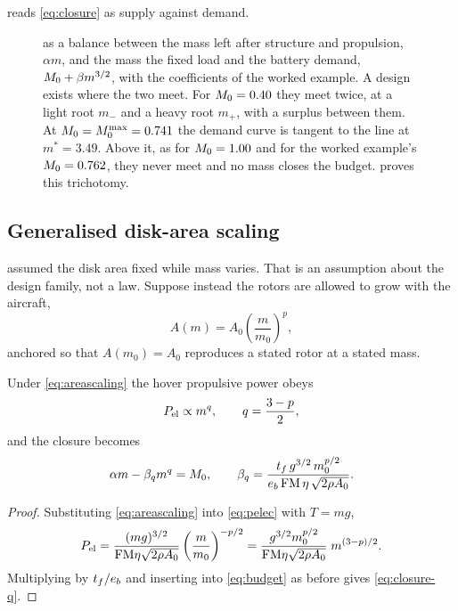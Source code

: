  reads \cref{eq:closure} as supply against demand.

\begin{figure}[tbp]
\centering

\caption{ as a balance between the mass left after structure
and propulsion, $\alpha m$, and the mass the fixed load and the battery demand,
$M_0 + \beta m^{3/2}$, with the coefficients of the worked example. A
design exists where the two meet. For $M_0 = 0.40$ they meet twice, at a
light root $m_-$ and a heavy root $m_+$, with a surplus between them. At
$M_0 = M_0^{\max} = 0.741$ the demand curve is tangent to the line at
$m^* = 3.49$. Above it, as for $M_0 = 1.00$ and for the worked example's
$M_0 = 0.762$, they never meet and no mass closes the budget.
 proves this trichotomy.}
\label{fig:closuregraph}
\end{figure}

\subsection{Generalised disk-area scaling}

 assumed the disk area fixed while mass varies. That is an
assumption about the design family, not a law. Suppose instead the rotors are
allowed to grow with the aircraft,
\begin{equation}
  A(m) = A_0 \left(\frac{m}{m_0}\right)^{p} ,
  \label{eq:areascaling}
\end{equation}
anchored so that $A(m_0) = A_0$ reproduces a stated rotor at a stated mass.

\begin{proposition}
\label{prop:plaw}
Under \cref{eq:areascaling} the hover propulsive power obeys
\begin{equation}
  P_{\mathrm{el}} \propto m^{q}, \qquad q = \frac{3-p}{2} ,
  \label{eq:qexp}
\end{equation}
and the closure becomes
\begin{equation}
  \alpha m - \beta_q m^{q} = M_0,
  \qquad
  \beta_q = \frac{t_f\,g^{3/2}\,m_0^{p/2}}
                 {e_b\,\mathrm{FM}\,\eta\,\sqrt{2\rho A_0}} .
  \label{eq:closure-q}
\end{equation}
\end{proposition}

\begin{proof}
Substituting \cref{eq:areascaling} into \cref{eq:pelec} with $T=mg$,
\[
  P_{\mathrm{el}} = \frac{(mg)^{3/2}}{\mathrm{FM}\eta\sqrt{2\rho A_0}}
           \left(\frac{m}{m_0}\right)^{-p/2}
         = \frac{g^{3/2} m_0^{p/2}}{\mathrm{FM}\eta\sqrt{2\rho A_0}}\; m^{(3-p)/2}.
\]
Multiplying by $t_f/e_b$ and inserting into \cref{eq:budget} as before gives
\cref{eq:closure-q}.
\end{proof}

